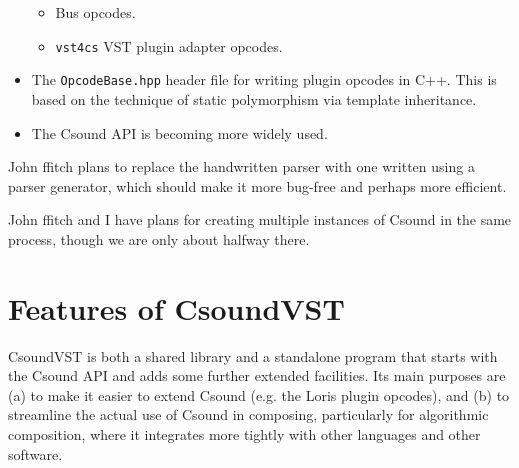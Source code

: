 \documentclass[10pt,letterpaper,onecolumn]{book}
\begin{document}
\begin{itemize}
\begin{itemize}
\item Bus opcodes.

\item \texttt{vst4cs} VST plugin adapter opcodes.

\end{itemize}

\item The \texttt{OpcodeBase.hpp} header file for writing plugin opcodes in C++. This is based on the technique of static polymorphism via template inheritance.

\item The Csound API is becoming more widely used.

\end{itemize}

John ffitch plans to replace the handwritten parser with one written using a parser generator, which should make it more bug-free and perhaps more efficient.

John ffitch and I have plans for creating multiple instances of Csound in the same process, though we are only about halfway there.

\section{Features of CsoundVST}

CsoundVST is both a shared library and a standalone program that starts with the Csound API and adds some further extended facilities. Its main purposes are (a) to make it easier to extend Csound (e.g. the Loris plugin opcodes), and (b) to streamline the actual use of Csound in composing, particularly for algorithmic composition, where it integrates more tightly with other languages and other software.
\end{document}
